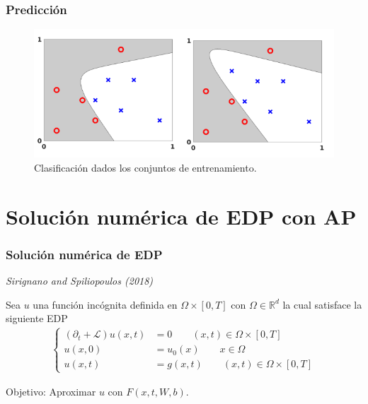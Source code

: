 \documentclass[aspectratio=1610]{beamer}
\begin{document}
\begin{frame}
  \frametitle{Predicci\'on}

  \begin{figure}[h]
    \centering
    \includegraphics[scale=2]{fig7}
    \caption{Clasificaci\'on dados los conjuntos de entrenamiento. }
  \end{figure}
  
\end{frame}


  \section{Solución num\'erica de EDP con AP }
\begin{frame}
  \frametitle{ Soluci\'on  num\'erica de EDP }
  \textit{Sirignano and Spiliopoulos (2018)}
  
  Sea $u$ una funci\'on inc\'ognita definida en $\Omega \times [0,T]$ con $\Omega\in \mathbb{R}^d$ la cual satisface la siguiente EDP
  \begin{align*}
    \begin{cases}
      (\partial_t + \mathcal{L}) u(x,t)  &= 0  \qquad  (x,t)\in \Omega \times [0,T] \\
      u(x,0) & = u_0(x) \qquad x\in \Omega \\
      u(x,t) & = g(x,t) \qquad (x,t) \in  \Omega \times [0,T] 
    \end{cases}
  \end{align*}

  Objetivo: Aproximar $u$ con $F(x,t,W,b)$.

\end{frame}
\end{document}
